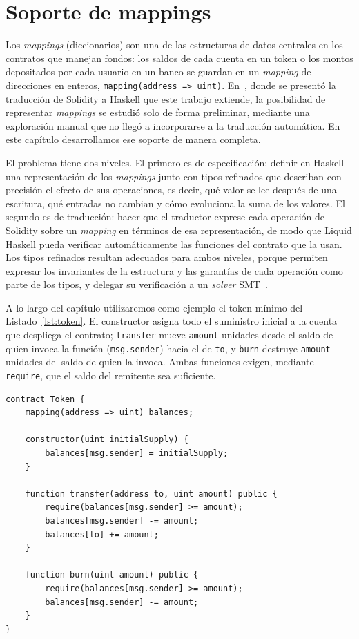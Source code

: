 
\chapter{Soporte de mappings}
\label{cap:mappings}

Los \emph{mappings} (diccionarios) son una de las estructuras de datos centrales en
los contratos que manejan fondos: los saldos de cada cuenta en un token o los montos
depositados por cada usuario en un banco se guardan en un \emph{mapping} de
direcciones en enteros, \lstinline[language=Solidity]|mapping(address => uint)|.
En~\cite{Consoli25}, donde se presentó la traducción de Solidity a Haskell que este
trabajo extiende, la posibilidad de representar \emph{mappings} se estudió solo de
forma preliminar, mediante una exploración manual que no llegó a incorporarse a la
traducción automática. En este capítulo desarrollamos ese soporte de manera completa.

El problema tiene dos niveles. El primero es de especificación: definir en Haskell una
representación de los \emph{mappings} junto con tipos refinados que describan con
precisión el efecto de sus operaciones, es decir, qué valor se lee después de una
escritura, qué entradas no cambian y cómo evoluciona la suma de los valores. El segundo
es de traducción: hacer que el traductor exprese cada operación de Solidity sobre un
\emph{mapping} en términos de esa representación, de modo que Liquid Haskell pueda
verificar automáticamente las funciones del contrato que la usan. Los tipos refinados
resultan adecuados para ambos niveles, porque permiten expresar los invariantes de la
estructura y las garantías de cada operación como parte de los tipos, y delegar su
verificación a un \emph{solver} SMT~\cite{VSJ+14}.

A lo largo del capítulo utilizaremos como ejemplo el token mínimo del
Listado~\ref{lst:token}. El constructor asigna todo el suministro inicial a la cuenta
que despliega el contrato; \lstinline|transfer| mueve \lstinline|amount| unidades
desde el saldo de quien invoca la función (\lstinline|msg.sender|) hacia el de
\lstinline|to|, y \lstinline|burn| destruye \lstinline|amount| unidades del saldo de
quien la invoca. Ambas funciones exigen, mediante \lstinline|require|, que el saldo
del remitente sea suficiente.

\begin{lstlisting}[language=Solidity, caption={Token mínimo con un \emph{mapping} de saldos.}, label={lst:token}]
contract Token {
    mapping(address => uint) balances;

    constructor(uint initialSupply) {
        balances[msg.sender] = initialSupply;
    }

    function transfer(address to, uint amount) public {
        require(balances[msg.sender] >= amount);
        balances[msg.sender] -= amount;
        balances[to] += amount;
    }

    function burn(uint amount) public {
        require(balances[msg.sender] >= amount);
        balances[msg.sender] -= amount;
    }
}
\end{lstlisting}

